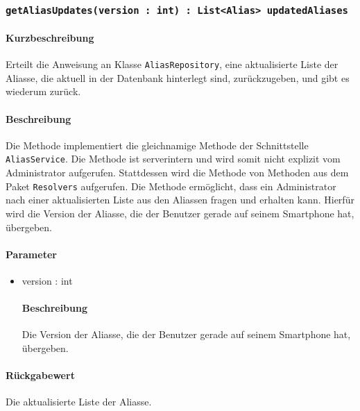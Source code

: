 \subsubsection{\texttt{getAliasUpdates(version : int) : List<Alias> updatedAliases}}%
\paragraph*{Kurzbeschreibung}
Erteilt die Anweisung an Klasse \texttt{AliasRepository}, eine aktualisierte Liste der Aliasse, die aktuell in der Datenbank hinterlegt sind, zurückzugeben, und gibt es wiederum zurück.
\paragraph*{Beschreibung}
Die Methode implementiert die gleichnamige Methode der Schnittstelle \texttt{AliasService}.
Die Methode ist serverintern und wird somit nicht explizit vom Administrator aufgerufen.
Stattdessen wird die Methode von Methoden aus dem Paket \texttt{Resolvers} aufgerufen.
Die Methode ermöglicht, dass ein Administrator nach einer aktualisierten Liste aus den Aliassen fragen und erhalten kann.
Hierfür wird die Version der Aliasse, die der Benutzer gerade auf seinem Smartphone hat, übergeben.
\paragraph*{Parameter}
\begin{itemize}
    \item version : int
    		\paragraph*{Beschreibung}
    		Die Version der Aliasse, die der Benutzer gerade auf seinem Smartphone hat, übergeben.
\end{itemize}
\paragraph*{Rückgabewert}
Die aktualisierte Liste der Aliasse.
